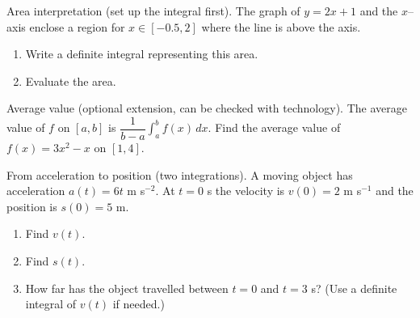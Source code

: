 \documentclass[11pt]{article}
\def\textbf#1{#1}%
\newcounter{question}
\begin{document}
\begin{question}
\textbf{Area interpretation (set up the integral first).}
The graph of $y=2x+1$ and the $x$–axis enclose a region for $x\in[-0.5,2]$ where the line is above the axis.
\begin{enumerate}
  \item Write a definite integral representing this area.
  \item Evaluate the area.

\begin{center}
\end{center}
\end{enumerate}
\end{question}

\begin{question}
\textbf{Average value (optional extension, can be checked with technology).}
The average value of $f$ on $[a,b]$ is $\dfrac{1}{b-a}\int_{a}^{b} f(x)\,dx$.  
Find the average value of $f(x)=3x^{2}-x$ on $[1,4]$.
\end{question}

\begin{question}
\textbf{From acceleration to position (two integrations).}
A moving object has acceleration $a(t)=6t$ m s$^{-2}$. At $t=0$ s the velocity is $v(0)=2$ m s$^{-1}$ and the position is $s(0)=5$ m.
\begin{enumerate}
  \item Find $v(t)$.
  \item Find $s(t)$.
  \item How far has the object travelled between $t=0$ and $t=3$ s? (Use a definite integral of $v(t)$ if needed.)
\end{enumerate}
\end{question}

\end{document}
